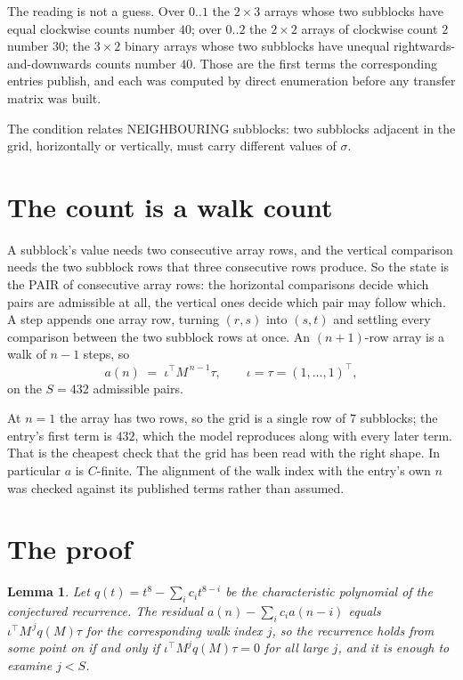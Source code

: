 \documentclass[11pt,a4paper]{article}
\theoremstyle{plain}
\newtheorem{lemma}[theorem]{Lemma}
\theoremstyle{definition}
\begin{document}
The reading is not a guess. Over $0..1$ the $2\times3$ arrays whose two subblocks have equal
clockwise counts number $40$; over $0..2$ the $2\times2$ arrays of clockwise count $2$ number
$30$; the $3\times2$ binary arrays whose two subblocks have unequal rightwards-and-downwards
counts number $40$. Those are the first terms the corresponding entries publish, and each was
computed by direct enumeration before any transfer matrix was built.

The condition relates NEIGHBOURING subblocks: two subblocks adjacent in the grid, horizontally
or vertically, must carry different values of $\sigma$.

\section{The count is a walk count}

A subblock's value needs two consecutive array rows, and the vertical
comparison needs the two subblock rows that three consecutive rows produce. So the state is the
PAIR of consecutive array rows: the horizontal comparisons decide which pairs are admissible at
all, the vertical ones decide which pair may follow which. A step appends one array row,
turning $(r,s)$ into $(s,t)$ and settling every comparison between the two subblock rows at
once. An $(n+1)$-row array is a walk of $n-1$ steps, so
\[
a(n)\;=\;\iota^{\!\top}M^{\,n-1}\tau,\qquad\iota=\tau=(1,\dots,1)^{\!\top},
\]
on the $S=432$ admissible pairs.

At $n=1$ the array has two rows, so the grid is a single row of $7$
subblocks; the entry's first term is $432$, which the model
reproduces along with every later term. That is the cheapest check that the grid has been read
with the right shape.
In particular $a$ is $C$-finite. The alignment of the walk index with the entry's own $n$ was
checked against its published terms rather than assumed.

\section{The proof}

\begin{lemma}\label{lem:crit}
Let $q(t)=t^{8}-\sum_i c_it^{8-i}$ be the characteristic polynomial of the
conjectured recurrence. The residual $a(n)-\sum_ic_ia(n-i)$ equals
$\iota^{\!\top}M^{\,j}q(M)\tau$ for the corresponding walk index $j$, so the recurrence
holds from some point on if and only if $\iota^{\!\top}M^{j}q(M)\tau=0$ for all large $j$,
and it is enough to examine $j<S$.
\end{lemma}
\end{document}
